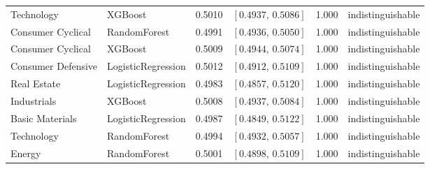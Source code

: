 \begin{longtable}{llrrrl}
Technology & XGBoost & 0.5010 & $[0.4937,\,0.5086]$ & 1.000 & indistinguishable \\
Consumer Cyclical & RandomForest & 0.4991 & $[0.4936,\,0.5050]$ & 1.000 & indistinguishable \\
Consumer Cyclical & XGBoost & 0.5009 & $[0.4944,\,0.5074]$ & 1.000 & indistinguishable \\
Consumer Defensive & LogisticRegression & 0.5012 & $[0.4912,\,0.5109]$ & 1.000 & indistinguishable \\
Real Estate & LogisticRegression & 0.4983 & $[0.4857,\,0.5120]$ & 1.000 & indistinguishable \\
Industrials & XGBoost & 0.5008 & $[0.4937,\,0.5084]$ & 1.000 & indistinguishable \\
Basic Materials & LogisticRegression & 0.4987 & $[0.4849,\,0.5122]$ & 1.000 & indistinguishable \\
Technology & RandomForest & 0.4994 & $[0.4932,\,0.5057]$ & 1.000 & indistinguishable \\
Energy & RandomForest & 0.5001 & $[0.4898,\,0.5109]$ & 1.000 & indistinguishable \\
\end{longtable}
